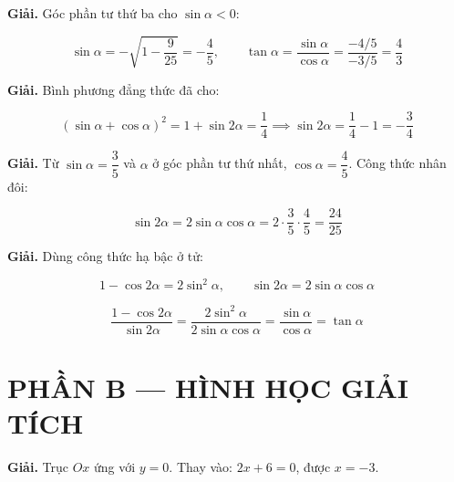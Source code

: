 \documentclass[11pt, a4paper]{article}
\begin{document}
\vspace{0.3cm}
\begin{dapan}[7 — Đáp án B]

\textbf{Giải.} Góc phần tư thứ ba cho $\sin\alpha < 0$:

$$\sin\alpha = -\sqrt{1 - \dfrac{9}{25}} = -\dfrac{4}{5}, \qquad \tan\alpha = \dfrac{\sin\alpha}{\cos\alpha} = \dfrac{-4/5}{-3/5} = \dfrac{4}{3}$$


\end{dapan}
\vspace{0.3cm}
\begin{dapan}[8 — Đáp án B]

\textbf{Giải.} Bình phương đẳng thức đã cho:

$$(\sin\alpha + \cos\alpha)^2 = 1 + \sin 2\alpha = \dfrac{1}{4} \implies \sin 2\alpha = \dfrac{1}{4} - 1 = -\dfrac{3}{4}$$


\end{dapan}
\vspace{0.3cm}
\begin{dapan}[9 — Đáp án D]

\textbf{Giải.} Từ $\sin\alpha = \dfrac{3}{5}$ và $\alpha$ ở góc phần tư thứ nhất, $\cos\alpha = \dfrac{4}{5}$. Công thức nhân đôi:

$$\sin 2\alpha = 2\sin\alpha\cos\alpha = 2 \cdot \dfrac{3}{5} \cdot \dfrac{4}{5} = \dfrac{24}{25}$$


\end{dapan}
\vspace{0.3cm}
\begin{dapan}[10 — Đáp án D]

\textbf{Giải.} Dùng công thức hạ bậc ở tử:

$$1 - \cos 2\alpha = 2\sin^2\alpha, \qquad \sin 2\alpha = 2\sin\alpha\cos\alpha$$

$$\dfrac{1 - \cos 2\alpha}{\sin 2\alpha} = \dfrac{2\sin^2\alpha}{2\sin\alpha\cos\alpha} = \dfrac{\sin\alpha}{\cos\alpha} = \tan\alpha$$

\section{PHẦN B — HÌNH HỌC GIẢI TÍCH}


\end{dapan}
\vspace{0.3cm}
\begin{dapan}[11 — Đáp án A]

\textbf{Giải.} Trục $Ox$ ứng với $y = 0$. Thay vào: $2x + 6 = 0$, được $x = -3$.


\end{dapan}
\end{document}
